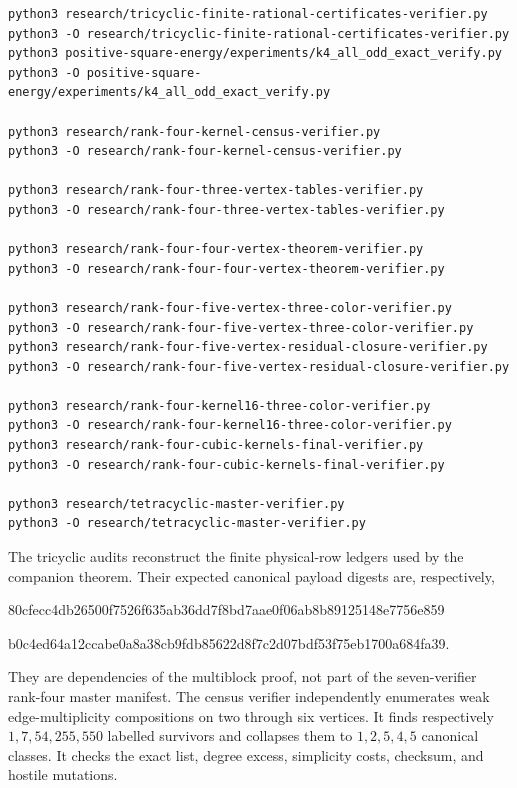 \documentclass[11pt]{article}
\theoremstyle{remark}
\begin{document}
\begin{verbatim}
python3 research/tricyclic-finite-rational-certificates-verifier.py
python3 -O research/tricyclic-finite-rational-certificates-verifier.py
python3 positive-square-energy/experiments/k4_all_odd_exact_verify.py
python3 -O positive-square-energy/experiments/k4_all_odd_exact_verify.py

python3 research/rank-four-kernel-census-verifier.py
python3 -O research/rank-four-kernel-census-verifier.py

python3 research/rank-four-three-vertex-tables-verifier.py
python3 -O research/rank-four-three-vertex-tables-verifier.py

python3 research/rank-four-four-vertex-theorem-verifier.py
python3 -O research/rank-four-four-vertex-theorem-verifier.py

python3 research/rank-four-five-vertex-three-color-verifier.py
python3 -O research/rank-four-five-vertex-three-color-verifier.py
python3 research/rank-four-five-vertex-residual-closure-verifier.py
python3 -O research/rank-four-five-vertex-residual-closure-verifier.py

python3 research/rank-four-kernel16-three-color-verifier.py
python3 -O research/rank-four-kernel16-three-color-verifier.py
python3 research/rank-four-cubic-kernels-final-verifier.py
python3 -O research/rank-four-cubic-kernels-final-verifier.py

python3 research/tetracyclic-master-verifier.py
python3 -O research/tetracyclic-master-verifier.py
\end{verbatim}

The tricyclic audits reconstruct the finite physical-row ledgers used by the
companion theorem.  Their expected canonical payload digests are, respectively,
\begin{center}\ttfamily\small
80cfecc4db26500f7526f635ab36dd7f8bd7aae0f06ab8b89125148e7756e859

b0c4ed64a12ccabe0a8a38cb9fdb85622d8f7c2d07bdf53f75eb1700a684fa39.
\end{center}
They are dependencies of the multiblock proof, not part of the seven-verifier
rank-four master manifest.  The census verifier independently enumerates weak edge-multiplicity
compositions on two through six vertices.  It finds respectively
$1,7,54,255,550$ labelled survivors and collapses them to
$1,2,5,4,5$ canonical classes.  It checks the exact list, degree excess,
simplicity costs, checksum, and hostile mutations.
\end{document}
